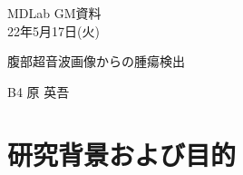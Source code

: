 \documentclass[a4j]{ujarticle}
\begin{document}
    \begin{flushright}
        MDLab GM資料\\
        22年5月17日(火)
    \end{flushright}

    \begin{center}
        {\Large	腹部超音波画像からの腫瘍検出}
    \end{center}

    \begin{flushright}
        {\large B4 原 英吾}\\
    \end{flushright}

    \section{研究背景および目的}
\end{document}
